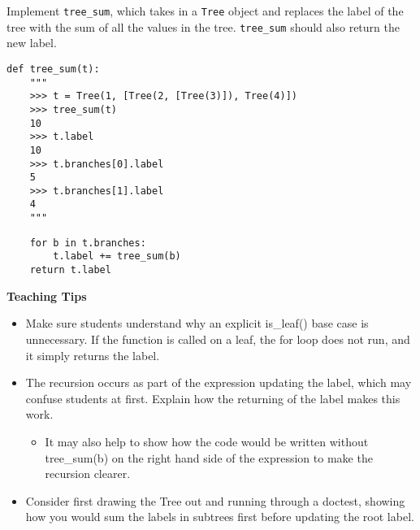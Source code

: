 \begin{blocksection}
\question Implement \lstinline{tree_sum}, which takes in a \lstinline{Tree}
object and replaces the label of the tree with the sum of all the values
in the tree. \lstinline{tree_sum} should also return the new label.

\begin{lstlisting}
def tree_sum(t):
    """
    >>> t = Tree(1, [Tree(2, [Tree(3)]), Tree(4)])
    >>> tree_sum(t)
    10
    >>> t.label
    10
    >>> t.branches[0].label
    5
    >>> t.branches[1].label
    4
    """
\end{lstlisting}

\begin{solution}[1in]
\begin{lstlisting}
    for b in t.branches:
        t.label += tree_sum(b)
    return t.label
\end{lstlisting}
\end{solution}
\end{blocksection}

\begin{guide}
    \textbf{Teaching Tips}
    \begin{itemize}
        \item Make sure students understand why an explicit is\_leaf() base case is unnecessary. If the function is called on a leaf, the for loop does not run, and it simply returns the label.
        \item The recursion occurs as part of the expression updating the label, which may confuse students at first. Explain how the returning of the label makes this work.
        \begin{itemize}
            \item It may also help to show how the code would be written without tree\_sum(b) on the right hand side of the expression to make the recursion clearer.
        \end{itemize}
        \item Consider first drawing the Tree out and running through a doctest, showing how you would sum the labels in subtrees first before updating the root label.
    \end{itemize}
\end{guide}
    
